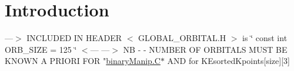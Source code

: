 \hypertarget{index_intro_sec}{}\section{Introduction}\label{index_intro_sec}
---$>$ I\-N\-C\-L\-U\-D\-E\-D I\-N H\-E\-A\-D\-E\-R $<$ G\-L\-O\-B\-A\-L\-\_\-\-O\-R\-B\-I\-T\-A\-L.\-H $>$ is \char`\"{} const int O\-R\-B\-\_\-\-S\-I\-Z\-E = 125 \char`\"{} $<$--- ---$>$ N\-B -\/ -\/ N\-U\-M\-B\-E\-R O\-F O\-R\-B\-I\-T\-A\-L\-S M\-U\-S\-T B\-E K\-N\-O\-W\-N A P\-R\-I\-O\-R\-I F\-O\-R "\hyperlink{binaryManip_8C}{binary\-Manip.\-C}$\ast$ A\-N\-D for K\-Esorted\-Kpoints\mbox{[}size\mbox{]}\mbox{[}3\mbox{]} 